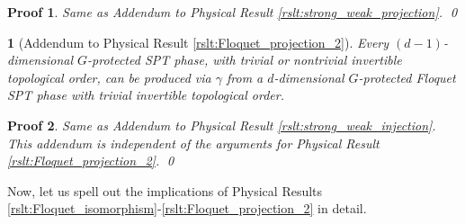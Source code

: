 \documentclass[sort&compress]{elsarticle}
\theoremstyle{theoremstyle}
\theoremstyle{framedtheoremstyle}
\theoremstyle{definitionstyle}
\theoremstyle{definitionstyle}
\theoremstyle{definitionstyle}
\theoremstyle{definitionstyle}
\theoremstyle{nameddefinitionstyle}
\theoremstyle{framednameddefinitionstyle}
\newtheorem*{framednameddef}{}
\theoremstyle{proofstyle}
\newtheorem{pf}{Proof}
\theoremstyle{definitionstyle}
\begin{document}
\begin{pf}
Same as Addendum to Physical Result \ref{rslt:strong_weak_projection}.
\qed\end{pf}

\begin{framed}\begin{framednameddef}[Addendum to Physical Result \ref{rslt:Floquet_projection_2}]
Every $(d-1)$-dimensional $G$-protected SPT phase, with trivial or nontrivial invertible topological order, can be produced via $\gamma$ from a $d$-dimensional $G$-protected Floquet SPT phase with trivial invertible topological order.
\end{framednameddef}\end{framed}

\begin{pf}
Same as Addendum to Physical Result \ref{rslt:strong_weak_injection}.
This addendum is independent of the arguments for Physical Result \ref{rslt:Floquet_projection_2}.
\qed\end{pf}


Now, let us spell out the implications of Physical Results \ref{rslt:Floquet_isomorphism}-\ref{rslt:Floquet_projection_2} in detail.
\end{document}

